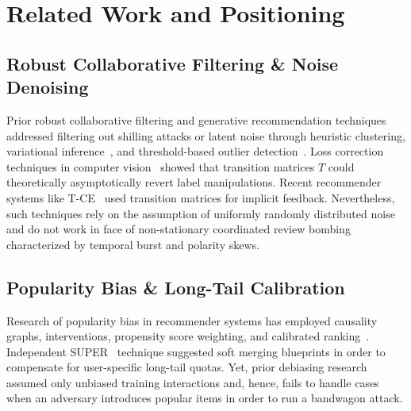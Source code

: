 \documentclass[10pt,journal]{IEEEtran}
\begin{document}
\section{Related Work and Positioning}
\label{sec:related}

\subsection{Robust Collaborative Filtering \& Noise Denoising}
Prior robust collaborative filtering and generative recommendation techniques addressed filtering out shilling attacks or latent noise through heuristic clustering, variational inference~\cite{liang2018variational}, and threshold-based outlier detection~\cite{wu2021robust,si2022shilling}. Loss correction techniques in computer vision~\cite{patrini2017making} showed that transition matrices $T$ could theoretically asymptotically revert label manipulations. Recent recommender systems like T-CE~\cite{gao2022self} used transition matrices for implicit feedback. Nevertheless, such techniques rely on the assumption of uniformly randomly distributed noise and do not work in face of non-stationary coordinated review bombing characterized by temporal burst and polarity skews.

\subsection{Popularity Bias \& Long-Tail Calibration}
Research of popularity bias in recommender systems has employed causality graphs, interventions, propensity score weighting, and calibrated ranking~\cite{abdollahpouri2019popularity,steck2018calibrated,zheng2021disentangling}. Independent SUPER~\cite{yang2022super} technique suggested soft merging blueprints in order to compensate for user-specific long-tail quotas. Yet, prior debiasing research assumed only unbiased training interactions and, hence, fails to handle cases when an adversary introduces popular items in order to run a bandwagon attack.
\end{document}
